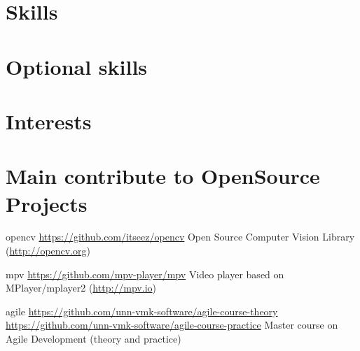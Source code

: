 \documentclass[11pt,a4paper]{moderncv}
\begin{document}
\section{Skills}

\section{Optional skills}

\section{Interests}


\section{Main contribute to OpenSource Projects}
\cvline
  {opencv}
  {\url{https://github.com/itseez/opencv}\newline{}
  Open Source Computer Vision Library (\url{http://opencv.org})}

\cvline
  {mpv}
  {\url{https://github.com/mpv-player/mpv}\newline{}
  Video player based on MPlayer/mplayer2 (\url{http://mpv.io})}

\cvline
  {agile}
  {
  \url{https://github.com/unn-vmk-software/agile-course-theory}\newline{}
  \url{https://github.com/unn-vmk-software/agile-course-practice}\newline{}
  Master course on Agile Development (theory and practice)
  }
\end{document}
